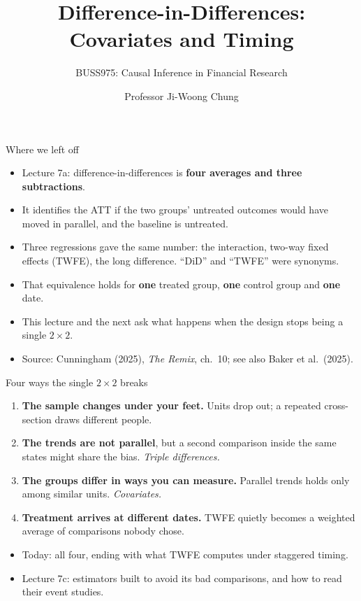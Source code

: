 \documentclass[
  11pt,
  ignorenonframetext,
  aspectratio=169,
]{beamer}
\title{\texorpdfstring{Difference-in-Differences: Covariates and
Timing}{Difference-in-Differences: Covariates and Timing}}
\subtitle{\texorpdfstring{BUSS975: Causal Inference in Financial
Research}{BUSS975: Causal Inference in Financial Research}}
\author{Professor Ji-Woong Chung}
\date{}
\institute{Korea University}
\providecommand{\tightlist}{%
  \setlength{\itemsep}{0pt}\setlength{\parskip}{0pt}}
\begin{document}
\frame{\titlepage}


\begin{frame}{Where we left off}
\protect{}\label{where-we-left-off}
\begin{itemize}
\tightlist
\item
  Lecture 7a: difference-in-differences is \textbf{four averages and
  three subtractions}.
\item
  It identifies the ATT if the two groups' untreated outcomes would have
  moved in parallel, and the baseline is untreated.
\item
  Three regressions gave the same number: the interaction, two-way fixed
  effects (TWFE), the long difference. ``DiD'' and ``TWFE'' were
  synonyms.
\end{itemize}

\vspace{0.5em}

\begin{itemize}
\tightlist
\item
  That equivalence holds for \textbf{one} treated group, \textbf{one}
  control group and \textbf{one} date.
\item
  This lecture and the next ask what happens when the design stops being
  a single \(2 \times 2\).
\item
  Source: Cunningham (2025), \emph{The Remix}, ch.~10; see also Baker et
  al.~(2025).
\end{itemize}
\end{frame}

\begin{frame}{Four ways the single \(2 \times 2\) breaks}
\protect{}\label{four-ways-the-single-2-times-2-breaks}
\begin{enumerate}
\tightlist
\item
  \textbf{The sample changes under your feet.} Units drop out; a
  repeated cross-section draws different people.
\item
  \textbf{The trends are not parallel}, but a second comparison inside
  the same states might share the bias. \emph{Triple differences.}
\item
  \textbf{The groups differ in ways you can measure.} Parallel trends
  holds only among similar units. \emph{Covariates.}
\item
  \textbf{Treatment arrives at different dates.} TWFE quietly becomes a
  weighted average of comparisons nobody chose.
\end{enumerate}

\vspace{0.5em}

\begin{itemize}
\tightlist
\item
  Today: all four, ending with what TWFE computes under staggered
  timing.
\item
  Lecture 7c: estimators built to avoid its bad comparisons, and how to
  read their event studies.
\end{itemize}
\end{frame}
\end{document}
